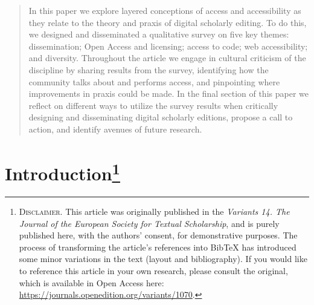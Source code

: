 
\begin{paper}
\renewcommand{\thesubsection}{\arabic{subsection}}  

\begin{abstract}In this paper we explore layered conceptions of access and accessibility
as they relate to the theory and praxis of digital scholarly editing. To
do this, we designed and disseminated a qualitative survey on five key
themes: dissemination; Open Access and licensing; access to code; web
accessibility; and diversity. Throughout the article we engage in
cultural criticism of the discipline by sharing results from the survey,
identifying how the community talks about and performs access, and
pinpointing where improvements in praxis could be made. In the final
section of this paper we reflect on different ways to utilize the survey
results when critically designing and disseminating digital scholarly
editions, propose a call to action, and identify avenues of future
research.
\end{abstract}


\section*{Introduction\footnote{\textsc{Disclaimer.} This article was originally published in the \emph{Variants 14. The Journal of the European Society for Textual Scholarship}, and is purely published here, with the authors' consent, for demonstrative purposes. The process of transforming the article's references into BibTeX has introduced some minor variations in the text (layout and bibliography). If you would like to reference this article in your own research, please consult the original, which is available in Open Access here: \href{https://journals.openedition.org/variants/1070}{https://journals.openedition.org/variants/1070}.}}


\end{paper}
